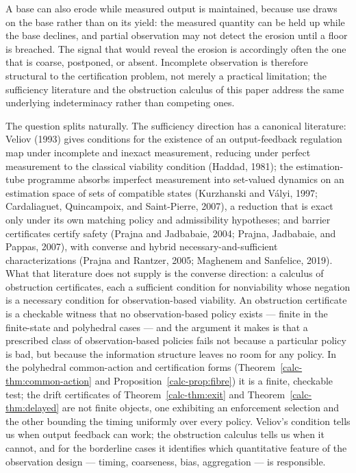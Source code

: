 \documentclass[10pt,twocolumn]{article}
\theoremstyle{definition}
\begin{document}
A base can also erode while measured output is maintained, because
use draws on the base rather than on its yield: the measured quantity
can be held up while the base declines, and partial observation may
not detect the erosion until a floor is breached. The signal that would reveal the erosion is
accordingly often the one that is coarse, postponed, or absent.
Incomplete observation is therefore structural to the certification
problem, not merely a practical limitation; the sufficiency literature
and the obstruction calculus of this paper address the same underlying
indeterminacy rather than competing ones.

The question splits naturally. The sufficiency direction has a canonical literature: Veliov (1993) gives conditions for the existence of an output-feedback regulation map under incomplete and inexact measurement, reducing under perfect measurement to the classical viability condition (Haddad, 1981); the estimation-tube programme absorbs imperfect measurement into set-valued dynamics on an estimation space of sets of compatible states (Kurzhanski and V\'alyi, 1997; Cardaliaguet, Quincampoix, and Saint-Pierre, 2007), a reduction that is exact only under its own matching policy and admissibility hypotheses; and barrier certificates certify safety (Prajna and Jadbabaie, 2004; Prajna, Jadbabaie, and Pappas, 2007), with converse and hybrid necessary-and-sufficient characterizations (Prajna and Rantzer, 2005; Maghenem and Sanfelice, 2019). What that literature does not supply is the converse direction: a calculus of obstruction certificates, each a sufficient condition for nonviability whose negation is a necessary condition for observation-based viability. An obstruction certificate is a checkable witness that no observation-based policy exists --- finite in the finite-state and polyhedral cases --- and the argument it makes is that a prescribed class of observation-based policies fails not because a particular policy is bad, but because the information structure leaves no room for any policy. In the polyhedral common-action and certification forms (Theorem~\ref{calc-thm:common-action} and Proposition~\ref{calc-prop:fibre}) it is a finite, checkable test; the drift certificates of Theorem~\ref{calc-thm:exit} and Theorem~\ref{calc-thm:delayed} are not finite objects, one exhibiting an enforcement selection and the other bounding the timing uniformly over every policy. Veliov's condition tells us when output feedback can work; the obstruction calculus tells us when it cannot, and for the borderline cases it identifies which quantitative feature of the observation design --- timing, coarseness, bias, aggregation --- is responsible.
\end{document}
